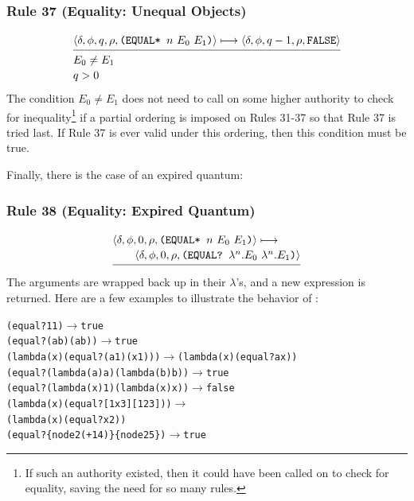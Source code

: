 \subsubsection*{Rule 37 (Equality: Unequal Objects)}
\[
\semanticrule{
\cfg{\delta}{\phi}{q}{\rho}{\THOR{(EQUAL* }n\ E_0\ E_1\THOR{)}}\redsto
      \cfg{\delta}{\phi}{q-1}{\rho}{\THOR{FALSE}}
}{
E_0\ne E_1\\ q>0
}
\]
The condition \(E_0\ne E_1\) does not need to call on some higher authority to
check for inequality\footnote{If such an authority existed, then it could have
been called on to check for equality, saving the need for so many rules.} if a
partial ordering is imposed on Rules 31-37 so that Rule 37 is tried last. If
Rule 37 is ever valid under this ordering, then this condition must be true.

Finally, there is the case of an expired quantum:

\subsubsection*{Rule 38 (Equality: Expired Quantum)}
\[
\semanticrule{
\cfg{\delta}{\phi}{0}{\rho}{\THOR{(EQUAL* }n\ E_0\ E_1\THOR{)}}\redsto\\ \qquad
      \cfg{\delta}{\phi}{0}{\rho}{\THOR{(EQUAL? }\lambda^n.E_0\ \lambda^n.E_1\THOR{)}}
}{

}
\]
The arguments are wrapped back up in their \(\lambda\)'s, and a new
 expression is returned. Here are a few examples to illustrate the
behavior of :
\par\smallskip\noindent\begin{minipage}{\linewidth}
\begin{alltt}
(equal?  1 1) \(\longrightarrow\)  true
(equal?  (a b) (a b)) \(\longrightarrow\)  true
(lambda (x) (equal?  (a 1) (x 1))) \(\longrightarrow\)  (lambda (x) (equal?  a x))
(equal?  (lambda (a) a) (lambda (b) b)) \(\longrightarrow\)  true
(equal?  (lambda (x) 1) (lambda (x) x)) \(\longrightarrow\)  false
(lambda (x) (equal?  [1 x 3] [1 2 3])) \(\longrightarrow\)
        (lambda (x) (equal?  x 2))
(equal?  \{node 2 (+ 1 4)\} \{node 2 5\}) \(\longrightarrow\)  true
\end{alltt}
\end{minipage}\par\smallskip

